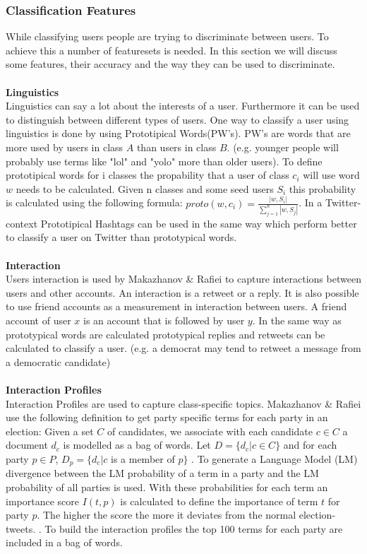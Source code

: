 \documentclass{article}
\begin{document}
\subsubsection{Classification Features}
While classifying users people are trying to discriminate between users. To achieve this a number of featuresets is needed. In this section we will discuss some features, their accuracy and the way they can be used to discriminate. 
\\\\
\textbf{Linguistics}\\
Linguistics can say a lot about the interests of a user. Furthermore it can be used to distinguish between different types of users. One way to classify a user using linguistics is done by using Prototipical Words(PW's). \cite{userclasst} PW's are words that are more used by users in class $A$ than users in class $B$. (e.g. younger people will probably use terms like "lol" and "yolo" more than older users). To define prototipical words for i classes the propability that a user of class $c_i$ will use word $w$ needs to be calculated. Given n classes and some seed users $S_i$ this probability is calculated using the following formula: $proto(w, c_i) = \frac{|w, S_i|}{\sum_{j=1}^n |w, S_j|}$.  In a Twitter-context Prototipical Hashtags can be used in the same way which perform better to classify a user on Twitter than prototypical words. \cite{userclasst}
\\\\
\textbf{Interaction}\\
Users interaction is used by Makazhanov \& Raﬁei to capture interactions between users and other accounts. \cite{pol} An interaction is a retweet or a reply. It is also possible to use friend accounts as a measurement in interaction between users.  A friend account of user $x$ is an account that is followed by user $y$. In the same way as prototypical words are calculated prototypical replies and retweets can be calculated to classify a user. (e.g. a democrat may tend to retweet a message from a democratic candidate) \cite{userclasst}
\\\\
\textbf{Interaction Profiles}\\
Interaction Profiles are used to capture class-specific topics. Makazhanov \& Raﬁei use the following definition to get party specific terms for each party in an election: Given a set $C$ of candidates, we associate with each candidate $c \in C$ a document $d_c$ is modelled as a bag of words. Let $D = \{d_c| c \in C\}$ and for each party $p \in P$, $D_p = \{d_c | c $ is a member of $p\}$ \cite{pol}. To generate a Language Model (LM) divergence between the LM probability of a term in a party and the LM probability of all parties is used. With these probabilities for each term an importance score $I(t,p)$ is calculated to define the importance of term $t$ for party $p$. The higher the score the more it deviates from the normal election-tweets. \cite{pol}. To build the interaction profiles the top 100 terms for each party are included in a bag of words. 
\end{document}
